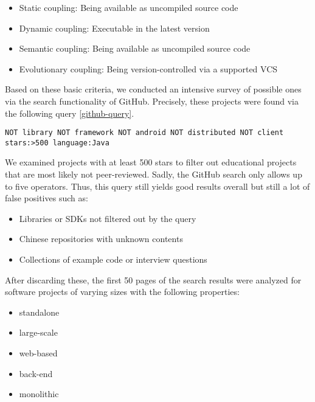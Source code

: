 \documentclass[12pt,a4paper]{report}
\begin{document}
\begin{itemize}[noitemsep]
  \item Static coupling: Being available as uncompiled source code
  \item Dynamic coupling: Executable in the latest version
  \item Semantic coupling: Being available as uncompiled source code
  \item Evolutionary coupling: Being version-controlled via a supported VCS
\end{itemize}

Based on these basic criteria, we conducted an intensive survey of possible
ones via the search functionality of GitHub. Precisely, these projects were
found via the following query \ref{github-query}.

\begin{lstlisting}[caption=GitHub experiment subjects search query, label=github-query, breaklines=true, basicstyle=\scriptsize\ttfamily]
NOT library NOT framework NOT android NOT distributed NOT client stars:>500 language:Java
\end{lstlisting}

We examined projects with at least 500 stars to filter out educational projects
that are most likely not peer-reviewed. Sadly, the GitHub search only allows up
to five  operators. Thus, this query still yields good results
overall but still a lot of false positives such as:

\begin{itemize}[noitemsep]
  \item Libraries or SDKs not filtered out by the query
  \item Chinese repositories with unknown contents
  \item Collections of example code or interview questions
\end{itemize}

After discarding these, the first 50 pages of the search results were analyzed
for software projects of varying sizes with the following properties:

\begin{itemize}[noitemsep]
  \item standalone
  \item large\hyp scale
  \item web\hyp based
  \item back\hyp end
  \item monolithic
\end{itemize}
\end{document}
